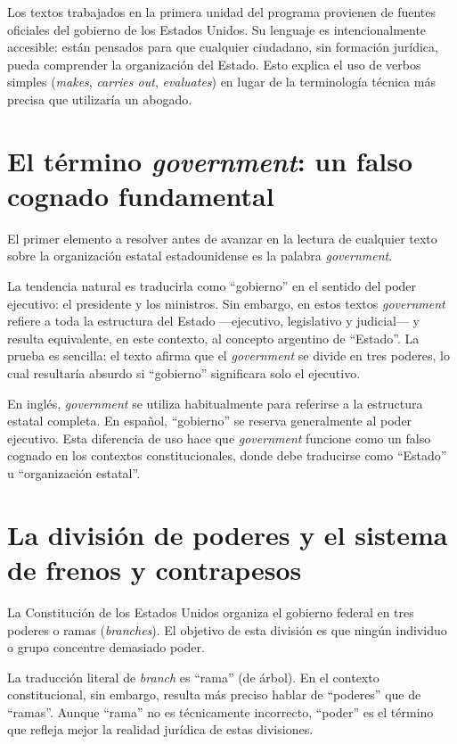 \documentclass[12pt,oneside]{book}
\begin{document}
Los textos trabajados en la primera unidad del programa provienen de fuentes oficiales del gobierno de los Estados Unidos. Su lenguaje es intencionalmente accesible: están pensados para que cualquier ciudadano, sin formación jurídica, pueda comprender la organización del Estado. Esto explica el uso de verbos simples (\textit{makes}, \textit{carries out}, \textit{evaluates}) en lugar de la terminología técnica más precisa que utilizaría un abogado.

\section{El término \textit{government}: un falso cognado fundamental}
\label{sec:government}

El primer elemento a resolver antes de avanzar en la lectura de cualquier texto sobre la organización estatal estadounidense es la palabra \textit{government}.

La tendencia natural es traducirla como ``gobierno'' en el sentido del poder ejecutivo: el presidente y los ministros. Sin embargo, en estos textos \textit{government} refiere a toda la estructura del Estado ---ejecutivo, legislativo y judicial--- y resulta equivalente, en este contexto, al concepto argentino de ``Estado''. La prueba es sencilla: el texto afirma que el \textit{government} se divide en tres poderes, lo cual resultaría absurdo si ``gobierno'' significara solo el ejecutivo.

\begin{important}
En inglés, \textit{government} se utiliza habitualmente para referirse a la estructura estatal completa. En español, ``gobierno'' se reserva generalmente al poder ejecutivo. Esta diferencia de uso hace que \textit{government} funcione como un falso cognado en los contextos constitucionales, donde debe traducirse como ``Estado'' u ``organización estatal''.
\end{important}

\section{La división de poderes y el sistema de frenos y contrapesos}

La Constitución de los Estados Unidos organiza el gobierno federal en tres poderes o ramas (\textit{branches}). El objetivo de esta división es que ningún individuo o grupo concentre demasiado poder.

\begin{note}
La traducción literal de \textit{branch} es ``rama'' (de árbol). En el contexto constitucional, sin embargo, resulta más preciso hablar de ``poderes'' que de ``ramas''. Aunque ``rama'' no es técnicamente incorrecto, ``poder'' es el término que refleja mejor la realidad jurídica de estas divisiones.
\end{note}
\end{document}

